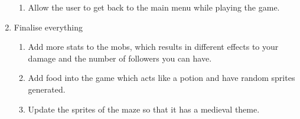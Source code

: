 \documentclass[../Main.tex]{subfiles}
\begin{document}
\begin{enumerate}
\begin{enumerate}
                    \item Allow the user to get back to the main menu while playing the game.
                \end{enumerate}
            \item Finalise everything
                \begin{enumerate}
                    \item Add more stats to the mobs, which results in different effects to your damage and the number of followers you can have.
                    \item Add food into the game which acts like a potion and have random sprites generated.
                    \item Update the sprites of the maze so that it has a medieval theme.
                \end{enumerate}
        \end{enumerate}
\end{document}
